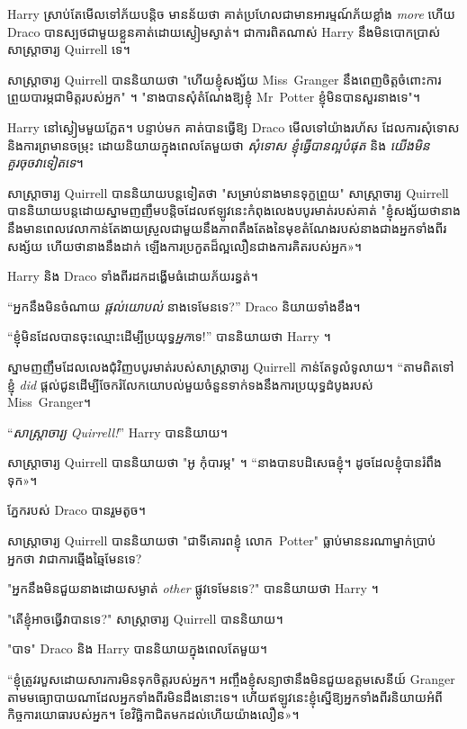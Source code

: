 {Harry ស្រាប់តែមើលទៅភ័យបន្តិច មានន័យថា គាត់ប្រហែលជាមានអារម្មណ៍ភ័យខ្លាំង \emph{more} ហើយ Draco បានស្បថជាមួយខ្លួនគាត់ដោយស្ងៀមស្ងាត់។ ជាការពិតណាស់ Harry នឹងមិនបោកប្រាស់សាស្រ្តាចារ្យ Quirrell ទេ។

សាស្ត្រាចារ្យ Quirrell បាននិយាយថា "ហើយខ្ញុំសង្ស័យ Miss~Granger នឹងពេញចិត្តចំពោះការព្រួយបារម្ភជាមិត្តរបស់អ្នក" ។ "នាងបានសុំតំណែងឱ្យខ្ញុំ Mr~Potter ខ្ញុំមិនបានសួរនាងទេ"។

Harry នៅស្ងៀមមួយភ្លែត។ បន្ទាប់មក គាត់បានធ្វើឱ្យ Draco មើលទៅយ៉ាងរហ័ស ដែលការសុំទោស និងការព្រមានចម្រុះ ដោយនិយាយក្នុងពេលតែមួយថា \emph{សុំទោស ខ្ញុំធ្វើបានល្អបំផុត} និង \emph{យើងមិនគួរចុចវាទៀតទេ}។

សាស្ត្រាចារ្យ Quirrell បាននិយាយបន្តទៀតថា "សម្រាប់នាងមានទុក្ខព្រួយ" សាស្ត្រាចារ្យ Quirrell បាននិយាយបន្តដោយស្នាមញញឹមបន្តិចដែលឥឡូវនេះកំពុងលេងបបូរមាត់របស់គាត់ "ខ្ញុំសង្ស័យថានាងនឹងមានពេលវេលាកាន់តែងាយស្រួលជាមួយនឹងភាពតឹងតែងនៃមុខតំណែងរបស់នាងជាងអ្នកទាំងពីរសង្ស័យ ហើយថានាងនឹងដាក់ ឡើង​ការ​ប្រកួត​ដ៏​ល្អ​លឿន​ជាង​ការ​គិត​របស់​អ្នក»។

Harry និង Draco ទាំងពីរដកដង្ហើមធំដោយភ័យរន្ធត់។

“អ្នកនឹងមិនចំណាយ \emph{ផ្តល់យោបល់} នាងទេមែនទេ?” Draco និយាយទាំងខឹង។

“ខ្ញុំមិនដែលបានចុះឈ្មោះដើម្បីប្រយុទ្ធ\emph{អ្នក}ទេ!” បាននិយាយថា Harry ។

ស្នាមញញឹមដែលលេងជុំវិញបបូរមាត់របស់សាស្រ្តាចារ្យ Quirrell កាន់តែទូលំទូលាយ។ “តាមពិតទៅ ខ្ញុំ \emph{did} ផ្តល់ជូនដើម្បីចែករំលែកយោបល់មួយចំនួនទាក់ទងនឹងការប្រយុទ្ធដំបូងរបស់ Miss~Granger។

“\emph{សាស្រ្តាចារ្យ Quirrell!}” Harry បាននិយាយ។

សាស្រ្តាចារ្យ Quirrell បាននិយាយថា "អូ កុំបារម្ភ" ។ “នាងបានបដិសេធខ្ញុំ។ ដូច​ដែល​ខ្ញុំ​បាន​រំពឹង​ទុក»។

ភ្នែករបស់ Draco បានរួមតូច។

សាស្រ្តាចារ្យ Quirrell បាននិយាយថា "ជាទីគោរពខ្ញុំ លោក~Potter" ធ្លាប់មាននរណាម្នាក់ប្រាប់អ្នកថា វាជាការឆ្មើងឆ្មៃមែនទេ?

"អ្នកនឹងមិនជួយនាងដោយសម្ងាត់ \emph{other} ផ្លូវទេមែនទេ?" បាននិយាយថា Harry ។

"តើខ្ញុំអាចធ្វើវាបានទេ?" សាស្ត្រាចារ្យ Quirrell បាននិយាយ។

"បាទ" Draco និង Harry បាននិយាយក្នុងពេលតែមួយ។

“ខ្ញុំ​ត្រូវ​របួស​ដោយ​សារ​ការ​មិន​ទុក​ចិត្ត​របស់​អ្នក។ អញ្ចឹងខ្ញុំសន្យាថានឹងមិនជួយឧត្តមសេនីយ៍ Granger តាមមធ្យោបាយណាដែលអ្នកទាំងពីរមិនដឹងនោះទេ។ ហើយឥឡូវនេះខ្ញុំស្នើឱ្យអ្នកទាំងពីរនិយាយអំពីកិច្ចការយោធារបស់អ្នក។ ខែ​វិច្ឆិកា​ជិត​មក​ដល់​ហើយ​យ៉ាង​លឿន»។

}
